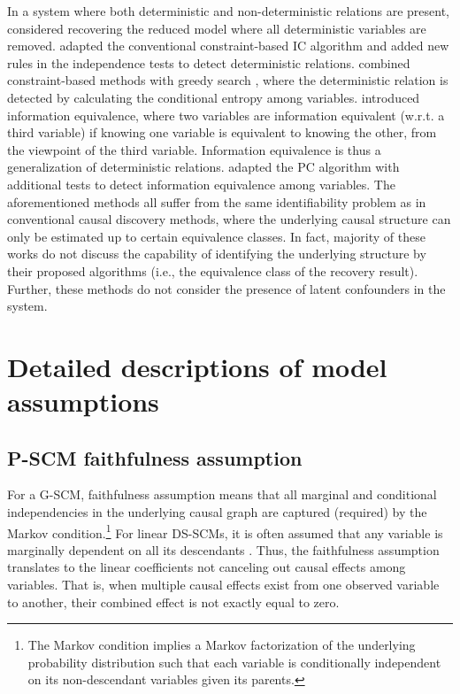 \documentclass[12pt]{article}
\newcommand{\bA}{\mathbf{A}}
\begin{document}
In a system where both deterministic and non-deterministic relations are present, \citet{scheines1996tetrad} considered recovering the reduced model where all deterministic variables are removed. \citet{luo2006learning} adapted the conventional constraint-based IC algorithm \citep{pearl2009causality} and added new rules in the independence tests to detect deterministic relations. \citet{mabrouk2014efficient} combined constraint-based methods with greedy search \citep{tsamardinos2006max}, where the deterministic relation is detected by calculating the conditional entropy among variables. \citet{lemeire2012conservative} introduced information equivalence, where two variables are information equivalent (w.r.t. a third variable) if knowing one variable is equivalent to knowing the other, from the viewpoint of the third variable. Information equivalence is thus a generalization of deterministic relations. \citet{lemeire2012conservative} adapted the PC algorithm with additional tests to detect information equivalence among variables.
The aforementioned methods all suffer from the same identifiability problem as in conventional causal discovery methods, where the underlying causal structure can only be estimated up to certain equivalence classes. In fact, majority of these works do not discuss the capability of identifying the underlying structure by their proposed algorithms (i.e., the equivalence class of the recovery result). Further, these methods do not consider the presence of latent confounders in the system. %


\section{Detailed descriptions of model assumptions} \label{app:assumptions}
\subsection{P-SCM faithfulness assumption}
For a G-SCM, faithfulness assumption means that all marginal and conditional independencies in the underlying causal graph are captured (required) by the Markov condition.\footnote{The Markov condition implies a Markov factorization of the underlying probability distribution such that each variable is conditionally independent on its non-descendant variables given its parents.} For linear DS-SCMs, it is often assumed that any variable is marginally dependent on all its descendants \citep{salehkaleybar2020learning}. Thus, the faithfulness assumption translates to the linear coefficients not canceling out causal effects among variables. That is, when multiple causal effects exist from one observed variable to another, their combined effect is not exactly equal to zero. 
\end{document}
